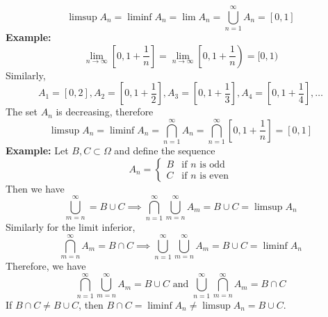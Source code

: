 \documentclass[openany]{report}
\begin{document}
\[\limsup A_n = \liminf A_n = \lim A_n = \bigcup_{n=1}^\infty A_n = [0,1]\]
\textbf{Example:}
\[\lim_{n\rightarrow\infty} \left[0, 1 + \frac{1}{n}\right] = \lim_{n\rightarrow\infty} \left[0, 1 + \frac{1}{n}\right) = [0,1)\]
Similarly,
\[A_1 = [0,2], A_2 = \left[0,1 + \frac{1}{2}\right], A_3 = \left[0,1 + \frac{1}{3}\right],A_4 = \left[0,1 + \frac{1}{4}\right], \ldots \]
The set $A_n$ is decreasing, therefore
\[\limsup A_n = \liminf A_n =\bigcap_{n=1}^\infty A_n = \bigcap_{n=1}^\infty \left[0, 1 + \frac{1}{n}\right] = [0,1]\]
\noindent
\textbf{Example:} Let $B, C \subset \Omega$ and define the sequence 
\[A_n = \begin{cases}
    B & \text{if } n \text{ is odd}\\
    C & \text{if } n \text{ is even}
\end{cases}\]
Then we have 
\[\bigcup_{m=n}^\infty = B \cup C \implies \bigcap_{n=1}^\infty \bigcup_{m=n}^\infty A_m = B \cup C = \limsup A_n\]
Similarly for the limit inferior, 
\[\bigcap_{m=n}^\infty A_m = B \cap C \implies \bigcup_{n=1}^\infty \bigcup_{m=n}^\infty A_m = B \cup C = \liminf A_n\]
Therefore, we have 
\[\bigcap_{n=1}^\infty \bigcup_{m=n}^\infty A_m = B \cup C \text{ and } \bigcup_{n=1}^\infty \bigcap_{m=n}^\infty A_m = B \cap C\]
If $B \cap C \neq B \cup C$, then $B \cap C = \liminf A_n \neq \limsup A_n = B \cup C$. 
\end{document}
